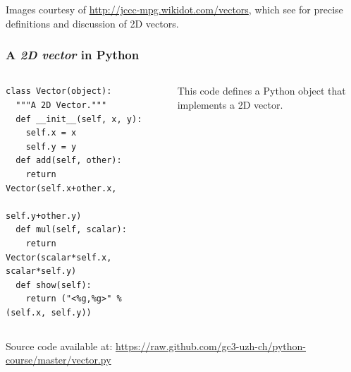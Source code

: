 \documentclass[english,serif,mathserif,xcolor=pdftex,dvipsnames,table]{beamer}
\begin{document}
\begin{frame}
  \begin{references}
    \tiny
    Images courtesy of \url{http://jccc-mpg.wikidot.com/vectors},
    which see for precise definitions and discussion of 2D vectors.
  \end{references}
\end{frame}


\begin{frame}[fragile]
  \frametitle{A \emph{2D vector} in Python}
  \begin{columns}[t]
    \begin{column}{0.5\textwidth}
\begin{lstlisting}
class Vector(object):
  """A 2D Vector."""
  def __init__(self, x, y):
    self.x = x
    self.y = y
  def add(self, other):
    return Vector(self.x+other.x,
                  self.y+other.y)
  def mul(self, scalar):
    return Vector(scalar*self.x, scalar*self.y)
  def show(self):
    return ("<%g,%g>" % (self.x, self.y))
\end{lstlisting}
    \end{column}
    \begin{column}{0.5\textwidth}
      \raggedleft
      This code defines a Python object that implements a 2D vector.
    \end{column}
  \end{columns}

  \+
  {\scriptsize Source code available at:
    \url{https://raw.github.com/gc3-uzh-ch/python-course/master/vector.py}}
\end{frame}
\end{document}
